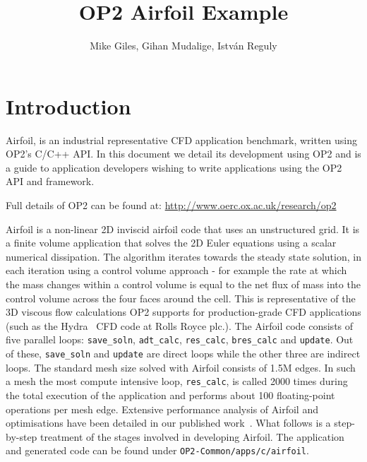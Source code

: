 \documentclass[11pt]{article}
\begin{document}
\title{OP2 Airfoil Example}
\author{Mike Giles, Gihan Mudalige, Istv{\'a}n Reguly}
\maketitle

\newpage




\tableofcontents

\newpage


\newpage
\section{Introduction}

Airfoil, is an industrial representative CFD application benchmark, written using OP2's C/C++ API. In this document we
detail its development using OP2 and is a guide to application developers wishing to write applications using the OP2
API and framework. 

\noindent Full details of OP2 can be found at: \url{http://www.oerc.ox.ac.uk/research/op2}

Airfoil is a non-linear 2D inviscid airfoil code that uses an unstructured grid. It is a finite volume application that
solves the 2D Euler equations using a scalar numerical dissipation. The algorithm iterates towards the steady state
solution, in each iteration using a control volume approach - for example the rate at which the mass changes within a
control volume is equal to the net flux of mass into the control volume across the four faces around the cell. This is
representative of the 3D viscous flow calculations OP2 supports for production-grade CFD applications (such as the
Hydra~\cite{11,12} CFD code at Rolls Royce plc.). The Airfoil code consists of five parallel loops: \texttt{save\_soln},
\texttt{adt\_calc}, \texttt{res\_calc}, \texttt{bres\_calc} and \texttt{update}. Out of these, \texttt{save\_soln} and
\texttt{update} are direct loops while the other three are indirect loops. The standard mesh size solved with Airfoil
consists of 1.5M edges. In such a mesh the most compute intensive loop, \texttt{res\_calc}, is called 2000 times during
the total execution of the application and performs about 100 floating-point operations per mesh edge. Extensive
performance analysis of Airfoil and optimisations have been detailed in our published work~\cite{PER2011, CJ2011,
PER2012, InPar2012}. What follows is a step-by-step treatment of the stages involved in developing Airfoil. The
application and generated code can be found under \texttt{OP2-Common/apps/c/airfoil}.\vspace{-5pt}
\end{document}

